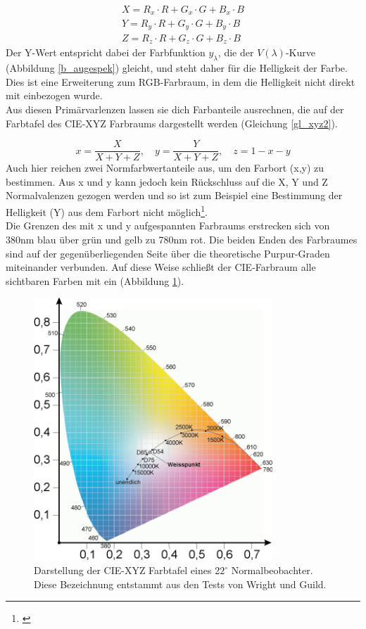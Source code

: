 \begin{eqnarray}\label{gl_xyz1}
		X = R_{x}\cdot R + G_{x}\cdot G + B_{x}\cdot B\\
		Y = R_{y}\cdot R + G_{y}\cdot G + B_{y}\cdot B\\
		Z = R_{z}\cdot R + G_{z}\cdot G + B_{z}\cdot B
\end{eqnarray}
Der Y-Wert entspricht dabei der Farbfunktion $y_{\lambda}$, die der $V(\lambda)$-Kurve (Abbildung \ref{b_augespek}) gleicht, und steht daher für die Helligkeit der Farbe. Dies ist eine Erweiterung zum RGB-Farbraum, in dem die Helligkeit nicht direkt mit einbezogen wurde.\\
Aus diesen Primärvarlenzen lassen sie dich Farbanteile ausrechnen, die auf der Farbtafel des CIE-XYZ Farbraums dargestellt werden (Gleichung \ref{gl_xyz2}). 
 

\begin{equation}\label{gl_xyz2}
		x = \frac{X}{X+Y+Z},\quad y = \frac{Y}{X+Y+Z},\quad z = 1-x-y
\end{equation}
Auch hier reichen zwei Normfarbwertanteile aus, um den Farbort (x,y) zu bestimmen. Aus x und y kann jedoch kein Rückschluss auf die X, Y und Z Normalvalenzen gezogen werden und so ist zum Beispiel eine Bestimmung der Helligkeit (Y) aus dem Farbort nicht möglich\footnote{\cite[79]{greule}}.\\
Die Grenzen des mit x und y aufgespannten Farbraums erstrecken sich von 380nm blau über grün und gelb zu 780nm rot. Die beiden Enden des Farbraumes sind auf der gegenüberliegenden Seite über die theoretische Purpur-Graden miteinander verbunden. Auf diese Weise schließt der CIE-Farbraum alle sichtbaren Farben mit ein (Abbildung \ref{b_xyz1}).

\begin{figure}[H]     %
\centering
\includegraphics[width=0.8\textwidth]{bilder/xyz1} 
\caption {Darstellung der CIE-XYZ Farbtafel eines 2$2^\circ$ Normalbeobachter. Diese Bezeichnung entstammt aus den Tests von Wright und Guild. \protect\footnotemark}\label{b_xyz1}
\end{figure}

